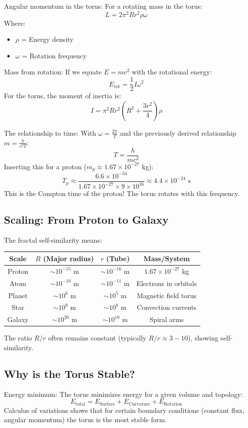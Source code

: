 \documentclass[12pt,a4paper]{article}
\begin{document}
Angular momentum in the torus:
For a rotating mass in the torus:
\[
L = 2\pi^2 R r^2 \rho \omega
\]
Where:
\begin{itemize}
	\item \( \rho \) = Energy density
	\item \( \omega \) = Rotation frequency
\end{itemize}

Mass from rotation:
If we equate \( E = mc^2 \) with the rotational energy:
\[
E_{\text{rot}} = \frac{1}{2} I \omega^2
\]
For the torus, the moment of inertia is:
\[
I = \pi^2 R r^2 \left(R^2 + \frac{3r^2}{4}\right) \rho
\]

The relationship to time:
With \( \omega = \frac{2\pi}{T} \) and the previously derived relationship \( m = \frac{h}{c^2 T} \):
\[
T = \frac{h}{mc^2}
\]
Inserting this for a proton (\( m_p \approx 1.67 \times 10^{-27} \) kg):
\[
T_p \approx \frac{6.6 \times 10^{-34}}{1.67 \times 10^{-27} \times 9 \times 10^{16}} \approx 4.4 \times 10^{-24} \text{ s}
\]
This is the Compton time of the proton! The torus rotates with this frequency.

\subsection{Scaling: From Proton to Galaxy}
The fractal self-similarity means:
\begin{table}[H]
	\centering
	\begin{tabular}{|c|c|c|c|}
		\hline
		Scale & \( R \) (Major radius) & \( r \) (Tube) & Mass/System \\
		\hline
		Proton & \( \sim 10^{-15} \) m & \( \sim 10^{-16} \) m & \( 1.67 \times 10^{-27} \) kg \\
		Atom & \( \sim 10^{-10} \) m & \( \sim 10^{-11} \) m & Electrons in orbitals \\
		Planet & \( \sim 10^{6} \) m & \( \sim 10^{5} \) m & Magnetic field torus \\
		Star & \( \sim 10^{9} \) m & \( \sim 10^{8} \) m & Convection currents \\
		Galaxy & \( \sim 10^{20} \) m & \( \sim 10^{19} \) m & Spiral arms \\
		\hline
	\end{tabular}
\end{table}
The ratio \( R/r \) often remains constant (typically \( R/r \approx 3-10 \)), showing self-similarity.

\subsection{Why is the Torus Stable?}
Energy minimum:
The torus minimizes energy for a given volume and topology:
\[
E_{\text{total}} = E_{\text{Surface}} + E_{\text{Curvature}} + E_{\text{Rotation}}
\]
Calculus of variations shows that for certain boundary conditions (constant flux, angular momentum) the torus is the most stable form.
\end{document}

